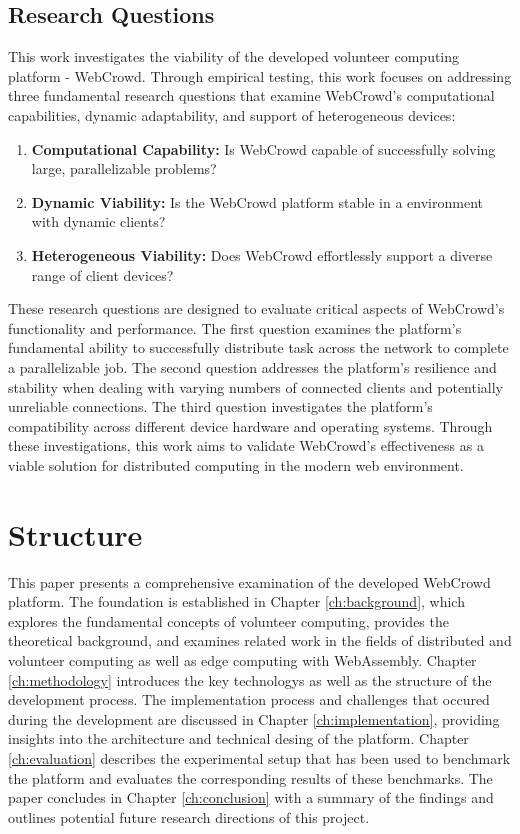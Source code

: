 \subsection{Research Questions}
\label{subsec:into:objectives:questions}
This work investigates the viability of the developed volunteer computing platform - WebCrowd. Through empirical testing, this work focuses on addressing three fundamental research questions that examine WebCrowd's computational capabilities, dynamic adaptability, and support of heterogeneous devices:
\begin{enumerate}
    \item \textbf{Computational Capability:} Is WebCrowd capable of successfully solving large, parallelizable problems?
    \item \textbf{Dynamic Viability:} Is the WebCrowd platform stable in a environment with dynamic clients?
    \item \textbf{Heterogeneous Viability:} Does WebCrowd effortlessly support a diverse range of client devices?
\end{enumerate}
These research questions are designed to evaluate critical aspects of WebCrowd's functionality and performance. The first question examines the platform's fundamental ability to successfully distribute task across the network to complete a parallelizable job. The second question addresses the platform's resilience and stability when dealing with varying numbers of connected clients and potentially unreliable connections. The third question investigates the platform's compatibility across different device hardware and operating systems. Through these investigations, this work aims to validate WebCrowd's effectiveness as a viable solution for distributed computing in the modern web environment.

\section{Structure}
\label{sec:intro:structure}
This paper presents a comprehensive examination of the developed WebCrowd platform. The foundation is established in Chapter \ref{ch:background}, which explores the fundamental concepts of volunteer computing, provides the theoretical background, and examines related work in the fields of distributed and volunteer computing as well as edge computing with WebAssembly. Chapter \ref{ch:methodology} introduces the key technologys as well as the structure of the development process. The implementation process and challenges that occured during the development are discussed in Chapter \ref{ch:implementation}, providing insights into the architecture and technical desing of the platform. Chapter \ref{ch:evaluation} describes the experimental setup that has been used to benchmark the platform and evaluates the corresponding results of these benchmarks. The paper concludes in Chapter \ref{ch:conclusion} with a summary of the findings and outlines potential future research directions of this project.

